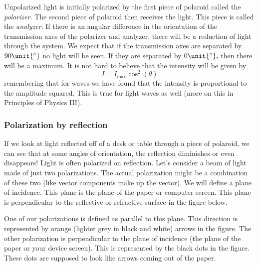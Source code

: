 \documentclass{article}
\begin{document}
Unpolarized light is initially polarized by the first piece of polaroid
called the \emph{polarizer}. The second piece of polaroid then receives the
light. This piece is called the \emph{analyzer}. If there is an angular
difference in the orientation of the transmission axes of the polarizer and
analyzer, there will be a reduction of light through the system. We expect
that if the transmission axes are separated by $90\unit{%
{{}^\circ}%
}$ no light will be seen. If they are separated by $0\unit{%
{{}^\circ}%
},$ then there will be a maximum. It is not hard to believe that the
intensity will be given by%
\begin{equation}
I=I_{\max }\cos ^{2}\left( \theta \right)
\end{equation}%
remembering that for waves we have found that the intensity is proportional
to the amplitude squared. This is true for light waves as well (more on this
in Principles of Physics III).

\subsubsection{Polarization by reflection}

If we look at light reflected off of a desk or table through a piece of
polaroid, we can see that at some angles of orientation, the reflection
diminishes or even disappears! Light is often polarized on reflection. Let's
consider a beam of light made of just two polarizations. The actual
polarization might be a combination of these two (like vector components
make up the vector). We will define a plane of incidence. This plane is the
plane of the paper or computer screen. This plane is perpendicular to the
reflective or refractive surface in the figure below.

One of our polarizations is defined as parallel to this plane. This
direction is represented by orange (lighter grey in black and white) arrows
in the figure. The other polarization is perpendicular to the plane of
incidence (the plane of the paper or your device screen). This is
represented by the black dots in the figure. These dots are supposed to look
like arrows coming out of the paper.
\end{document}
